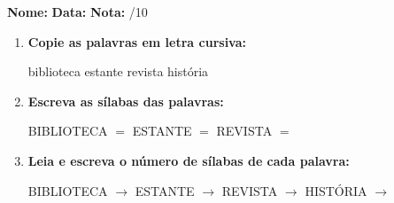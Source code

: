 \begin{exercicio}



\noindent\textbf{Nome:} \underline{\hspace{3.2cm}} \quad \textbf{Data:} \underline{\hspace{1.6cm}} \quad \textbf{Nota:} \underline{\hspace{0.9cm}}/10


\begin{enumerate}

  \item \textbf{Copie as palavras em letra cursiva:}
  \begin{center}
  biblioteca \quad estante \quad revista \quad história
  \end{center}
  \begin{center}
  \underline{\hspace{2.4cm}} \quad \underline{\hspace{2.4cm}} \quad \underline{\hspace{2.4cm}} \quad \underline{\hspace{2.4cm}}
  \end{center}

  \item \textbf{Escreva as sílabas das palavras:}
  \begin{center}
  BIBLIOTECA $=$ \underline{\hspace{1.5cm}} \underline{\hspace{1.5cm}} \quad ESTANTE $=$ \underline{\hspace{1.5cm}} \underline{\hspace{1.5cm}} \quad REVISTA $=$ \underline{\hspace{1.5cm}} \underline{\hspace{1.5cm}}
  \end{center}

  \item \textbf{Leia e escreva o número de sílabas de cada palavra:}
  \begin{center}
  BIBLIOTECA $\rightarrow$ \underline{\hspace{0.9cm}} \quad ESTANTE $\rightarrow$ \underline{\hspace{0.9cm}} \quad REVISTA $\rightarrow$ \underline{\hspace{0.9cm}} \quad HISTÓRIA $\rightarrow$ \underline{\hspace{0.9cm}}
  \end{center}


\end{enumerate}
\end{exercicio}
